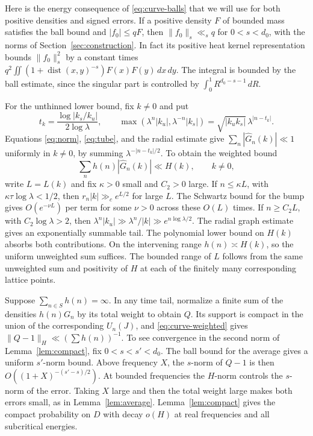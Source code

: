 \documentclass[11pt,a4paper,reqno]{amsart}
\theoremstyle{definition}
\theoremstyle{remark}
\numberwithin{equation}{section}
\begin{document}
Here is the energy consequence of \eqref{eq:curve-balls} that we will
use for both positive densities and signed errors. If a positive
density \(F\) of bounded mass satisfies the ball bound and
\(|f_0|\le qF\), then \(\|f_0\|_s\ll_s q\) for \(0<s<d_0\), with the
norms of Section~\ref{sec:construction}. In fact its positive heat
kernel representation bounds \(\|f_0\|_s^2\) by a constant times
\(q^2\iint (1+\operatorname{dist}(x,y)^{-s})F(x)F(y)\,dx\,dy\).
The integral is bounded by the ball estimate, since the singular part
is controlled by \(\int_0^1 R^{d_0-s-1}\,dR\).

For the unthinned lower bound, fix \(k\ne0\) and put
\[
 t_k=\frac{\log |k_s/k_u|}{2\log\lambda},\qquad
 \max(\lambda^n|k_u|,\lambda^{-n}|k_s|)
       =\sqrt{|k_u k_s|}\,\lambda^{|n-t_k|}.
\]
Equations \eqref{eq:norm}, \eqref{eq:tube}, and the radial estimate
give \(\sum_n|\widehat G_n(k)|\ll1\) uniformly in \(k\ne0\), by
summing \(\lambda^{-|n-t_k|/2}\). To obtain the weighted bound
\begin{equation}\label{eq:curve-weighted}
                  \sum_n h(n)|\widehat G_n(k)|\ll H(k),
                  \qquad k\ne0,
\end{equation}
write \(L=L(k)\) and fix \(\kappa>0\) small and \(C_2>0\) large.
If \(n\le\kappa L\), with \(\kappa\tau\log\lambda<1/2\), then
\(r_n|k|\gg_c e^{L/2}\) for large \(L\). The Schwartz bound for the
bump gives \(O(e^{-\nu L})\) per term for some \(\nu>0\) across
these \(O(L)\) times. If \(n\ge C_2 L\), with \(C_2\log\lambda>2\),
then \(\lambda^n|k_u|\gg \lambda^n/|k|\gg e^{n\log\lambda/2}\).
The radial graph estimate gives an exponentially summable tail.
The polynomial lower bound on \(H(k)\) absorbs both contributions.
On the intervening range \(h(n)\asymp H(k)\), so the uniform unweighted
sum suffices. The bounded range of \(L\) follows from the same
unweighted sum and positivity of \(H\) at each of the finitely many
corresponding lattice points.

Suppose \(\sum_{n\in S}h(n)=\infty\). In any time tail, normalize a
finite sum of the densities \(h(n)G_n\) by its total weight to obtain
\(Q\). Its support is compact in the union of the corresponding
\(U_n(J)\), and \eqref{eq:curve-weighted} gives
\(\|Q-1\|_H\ll(\sum h(n))^{-1}\). To see convergence in the second norm
of Lemma~\ref{lem:compact}, fix \(0<s<s'<d_0\). The ball bound for
the average gives a uniform \(s'\)-norm bound. Above frequency \(X\),
the \(s\)-norm of \(Q-1\) is then \(O((1+X)^{-(s'-s)/2})\).
At bounded frequencies the \(H\)-norm controls the \(s\)-norm of
the error. Taking \(X\) large and then the total weight large makes
both errors small, as in Lemma~\ref{lem:average}. Lemma~\ref{lem:compact}
gives the compact probability on \(D\) with decay \(o(H)\) at real
frequencies and all subcritical energies.
\end{document}
